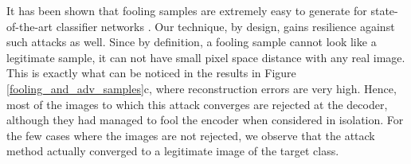 \documentclass[letterpaper]{article} %
\begin{document}
It has been shown that fooling samples are extremely easy to generate for state-of-the-art classifier networks . Our technique, by design, gains resilience against such attacks as well. Since by definition, a fooling sample cannot look like a legitimate sample, it can not have small pixel space distance with any real image. This is exactly what can be noticed in the results in Figure \ref{fooling_and_adv_samples}c, where reconstruction errors are very high. Hence, most of the images to which this attack converges are rejected at the decoder, although they had managed to fool the encoder when considered in isolation. For the few cases where the images are not rejected, we observe that the attack method actually converged to a legitimate image of the target class.
\end{document}
